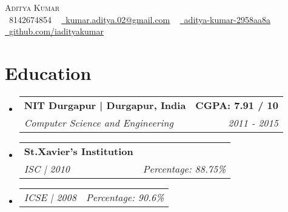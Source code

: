 \documentclass[letterpaper,11pt]{article}
\makeatletter
\newcommand{\resumeSubheading}[4]{
  \vspace{-2pt}\item
    \begin{tabular*}{1.0\textwidth}[t]{l@{\extracolsep{\fill}}r}
      \textbf{#1} & \textbf{\small #2} \\
      \textit{\small#3} & \textit{\small #4} \\
    \end{tabular*}\vspace{-7pt}
}
\newcommand{\resumeSubSubheading}[2]{
    \item
	\begin{tabular*}{1.0\textwidth}{l@{\extracolsep{\fill}}r}
      \textit{\small#1} & \textit{\small #2} \\
    \end{tabular*}\vspace{-7pt}
}
\newcommand{\resumeSubHeadingListStart}{\begin{itemize}[leftmargin=0.0in, label={}]}
\newcommand{\resumeSubHeadingListEnd}{\end{itemize}}
\makeatother
\begin{document}

\begin{center}
    {\Huge \scshape Aditya Kumar}  \\ \vspace{1pt}
    \small \raisebox{-0.1\height}\faPhone\ 8142674854 ~ \href{mailto:kumar.aditya.02@gmail.com}{\raisebox{-0.2\height}\faEnvelope\  \underline{kumar.aditya.02@gmail.com}} ~ 
    \href{https://www.linkedin.com/in/aditya-kumar-2958aa8a/}{\raisebox{-0.2\height}\faLinkedin\ \underline{aditya-kumar-2958aa8a}}  ~
    \href{https://github.com/iadityakumar}{\raisebox{-0.2\height}\faGithub\ \underline{github.com/iadityakumar}}
    \vspace{-8pt}
\end{center}

\section{Education}
  \resumeSubHeadingListStart
    \resumeSubheading
      {NIT Durgapur | Durgapur, India}{CGPA: 7.91 / 10}
      {Computer Science and Engineering}{ 2011 - 2015}
     \resumeSubheading
     {St.Xavier's Institution}{}
     {ISC | 2010}{Percentage: 88.75\%}
     \resumeSubSubheading
     {ICSE | 2008}{ \indent Percentage: 90.6\%}
     
  \resumeSubHeadingListEnd
\end{document}
